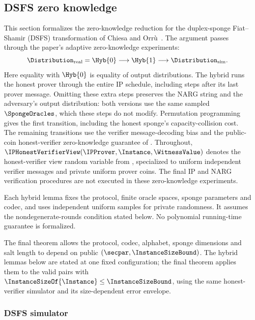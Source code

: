 \subsection{DSFS zero knowledge}
\label{sec:duplex_sponge_zero_knowledge}

This section formalizes the zero-knowledge reduction for the duplex-sponge Fiat--Shamir (DSFS) transformation of Chiesa and Orr\`u~\cite{CO25}. The argument passes through the paper's adaptive zero-knowledge experiments:
\begin{equation*}
  \Distribution_{\mathrm{real}}=\Hyb{0}
    \longrightarrow\Hyb{1}
    \longrightarrow\Distribution_{\mathrm{sim}}.
\end{equation*}
Here equality with \(\Hyb{0}\) is equality of output distributions. The hybrid runs the honest prover through the entire IP schedule, including steps after its last prover message. Omitting these extra steps preserves the NARG string and the adversary's output distribution: both versions use the same sampled \(\SpongeOracles\), which these steps do not modify. Permutation programming gives the first transition, including the honest sponge's capacity-collision cost. The remaining transitions use the verifier message-decoding bias and the public-coin honest-verifier zero-knowledge guarantee of . Throughout, \(\IPHonestVerifierView(\IPProver,\Instance,\WitnessValue)\) denotes the honest-verifier view random variable from , specialized to uniform independent verifier messages and private uniform prover coins. The final IP and NARG verification procedures are not executed in these zero-knowledge experiments.

Each hybrid lemma fixes the protocol, finite oracle spaces, sponge parameters and codec, and uses independent uniform samples for private randomness. It assumes the nondegenerate-rounds condition stated below. No polynomial running-time guarantee is formalized.

The final theorem allows the protocol, codec, alphabet, sponge dimensions and salt length to depend on public \((\secpar,\InstanceSizeBound)\). The hybrid lemmas below are stated at one fixed configuration; the final theorem applies them to the valid pairs with \(\InstanceSizeOf{\Instance}\le\InstanceSizeBound\), using the same honest-verifier simulator and its size-dependent error envelope.

\subsubsection{DSFS simulator}

